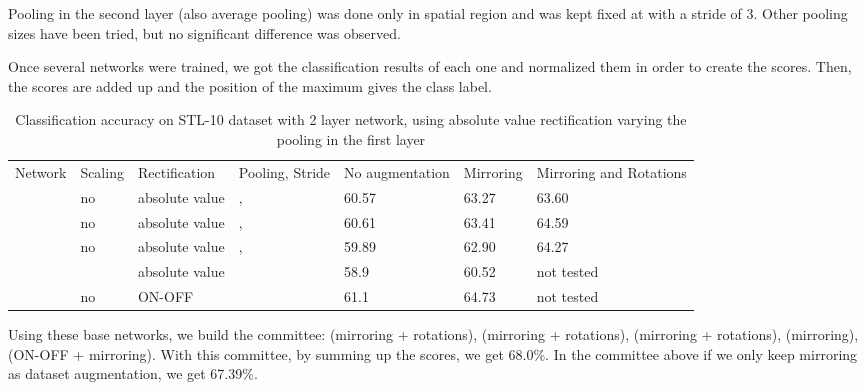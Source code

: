 \documentclass[runningheads]{llncs}
\begin{document}
Pooling in the second layer (also average pooling) was done only in spatial region and was kept fixed at  with a stride of 3. Other pooling sizes have been tried, but no significant difference was observed. 


Once several networks were trained, we got the classification results of each one and normalized them in order to create the scores. Then, the scores are added up and the position of the maximum gives the class label.

\setlength{\tabcolsep}{4pt}
\begin{table}
\begin{center}
\caption{Classification accuracy on STL-10 dataset with 2 layer network, using absolute value rectification varying the pooling in the first layer}
\begin{tabular}{l|l|l|l|l|l|p{2cm}}
\hline\noalign{\smallskip}
Network & Scaling & Rectification & Pooling, Stride & No augmentation & Mirroring & Mirroring and Rotations\\
\noalign{\smallskip}
\hline
\noalign{\smallskip}
 & no & absolute value & ,  & 60.57 & 63.27 & 63.60\\
\hline
 & no & absolute value & ,  & 60.61 & 63.41 & 64.59 \\
\hline
 & no & absolute value &,  & 59.89  & 62.90  &  64.27  \\
\hline
 &  & absolute value &  & 58.9 & 60.52 & not tested \\
\hline
 & no & ON-OFF &  & 61.1 & 64.73 & not tested \\
\hline

\end{tabular}
\end{center}
\end{table}
\setlength{\tabcolsep}{1.4pt}


Using these base networks, we build the committee:  (mirroring + rotations),  (mirroring + rotations),  (mirroring + rotations),  (mirroring),  (ON-OFF + mirroring).
With this committee, by summing up the scores, we get 68.0\%. 
In the committee above if we only keep mirroring as dataset augmentation, we get 67.39\%.
\end{document}
